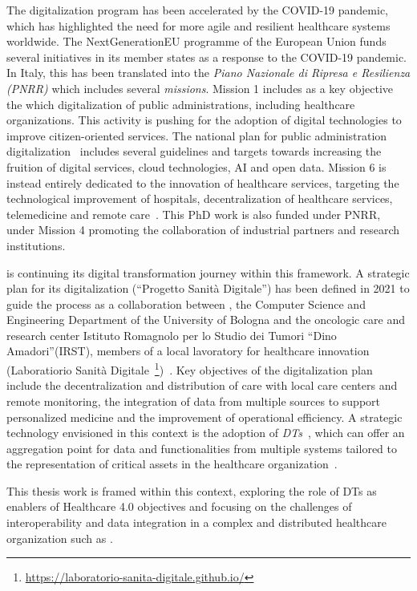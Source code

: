 The digitalization program has been accelerated by the COVID-19 pandemic, which has highlighted the need for more agile and resilient healthcare systems worldwide.
%
The NextGenerationEU programme of the European Union funds several initiatives in its member states as a response to the COVID-19 pandemic. 
%
In Italy, this has been translated into the \emph{Piano Nazionale di Ripresa e Resilienza (PNRR)} which includes several \emph{missions}.
Mission 1 includes as a key objective the which digitalization of public administrations, including healthcare organizations. %
This activity is pushing for the adoption of digital technologies to improve citizen-oriented services.
%
The national plan for public administration digitalization~\cite{AgID_PianoTriennale_2025} includes several guidelines and targets towards increasing the fruition of digital services, cloud technologies, \ac{AI} and open data.
Mission 6 is instead entirely dedicated to the innovation of healthcare services, targeting the technological improvement of hospitals, decentralization of healthcare services, telemedicine and remote care~\cite{italy_pnrr_2021}.
%
This PhD work is also funded under PNRR, under Mission 4 promoting the collaboration of industrial partners and research institutions.

\ausl{} is continuing its digital transformation journey within this framework.
%
A strategic plan for its digitalization (``Progetto Sanità Digitale'') has been defined in 2021 to guide the process as a collaboration between \ausl{}, the Computer Science and Engineering Department of the University of Bologna and the oncologic care and research center {Istituto Romagnolo per lo Studio dei Tumori ``Dino Amadori''(IRST)}, members of a local lavoratory for healthcare innovation (Laboratiorio Sanità Digitale~\footnote{\url{https://laboratorio-sanita-digitale.github.io/}})~\cite{progetto_sanità_digitale}.
%
Key objectives of the digitalization plan include the decentralization and distribution of care with local care centers and remote monitoring, the integration of data from multiple sources to support personalized medicine and the improvement of operational efficiency. 
%
A strategic technology envisioned in this context is the adoption of \emph{\acp{DT}~\cite{Grieves_2023}}, which can offer an aggregation point for data and functionalities from multiple systems tailored to the representation of critical assets in the healthcare organization~\cite{progetto_sanità_digitale}.

This thesis work is framed within this context, exploring the role of \acp{DT} as enablers of Healthcare 4.0 objectives and focusing on the challenges of interoperability and data integration in a complex and distributed healthcare organization such as \ausl{}.

